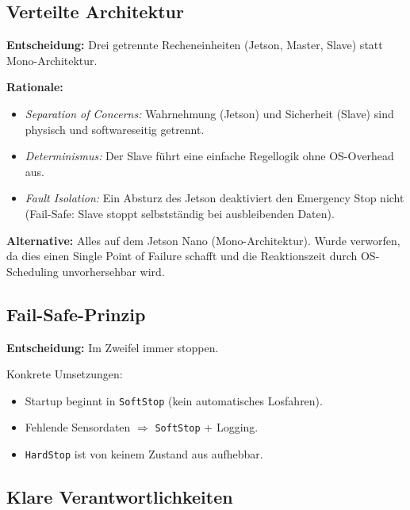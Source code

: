 \subsection{Verteilte Architektur}
\label{sec:entsch_verteilung}

\textbf{Entscheidung:} Drei getrennte Recheneinheiten (Jetson, Master, Slave)
statt Mono-Architektur.

\textbf{Rationale:}
\begin{itemize}
  \item \emph{Separation of Concerns:} Wahrnehmung (Jetson) und Sicherheit (Slave)
        sind physisch und softwareseitig getrennt.
  \item \emph{Determinismus:} Der Slave führt eine einfache Regellogik ohne
        \ac{OS}-Overhead aus.
  \item \emph{Fault Isolation:} Ein Absturz des Jetson deaktiviert den Emergency Stop
        nicht (Fail-Safe: Slave stoppt selbstständig bei ausbleibenden Daten).
\end{itemize}

\textbf{Alternative:} Alles auf dem Jetson Nano (Mono-Architektur).
Wurde verworfen, da dies einen Single Point of Failure schafft und
die Reaktionszeit durch \ac{OS}-Scheduling unvorhersehbar wird.

\subsection{Fail-Safe-Prinzip}
\label{sec:entsch_failsafe}

\textbf{Entscheidung:} Im Zweifel immer stoppen.

Konkrete Umsetzungen:
\begin{itemize}
  \item Startup beginnt in \texttt{SoftStop} (kein automatisches Losfahren).
  \item Fehlende Sensordaten $\Rightarrow$ \texttt{SoftStop} + Logging.
  \item \texttt{HardStop} ist von keinem Zustand aus aufhebbar.
\end{itemize}

\subsection{Klare Verantwortlichkeiten}
\label{sec:entsch_verantwortlichkeiten}

